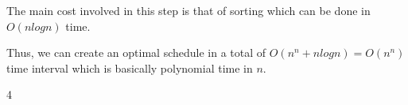 \documentclass[letterpaper,portrait,12pt]{article}
\begin{document}
\begin{flushleft}

\end{flushleft}


\begin{flushleft}
The main cost involved in this step is that of sorting which can be done in $O(nlogn)$ time.
\end{flushleft}


\begin{flushleft}

\end{flushleft}


\begin{flushleft}
Thus, we can create an optimal schedule in a total of $O(n^n + nlogn) = O(n^n)$ time interval which is basically polynomial time in $n$.
\end{flushleft}


\begin{flushleft}

\end{flushleft}


\begin{flushleft}

\end{flushleft}




4
\end{document}

